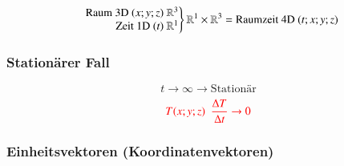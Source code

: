 $$\left.\begin{array}{r@{}}
    \text{Raum 3D ${(x;y;z)}$ }\rreal^3\\
    \text{Zeit 1D ${(t)}$ }\rreal^1
\end{array}\right\rbrace \rreal^{1}\times \rreal^3 = \text{Raumzeit 4D} \text{ } (t;x;y;z)$$

\subsubsection{Stationärer Fall}
$${t \rightarrow \infty \rightarrow \text{Stationär}}$$
$${{\color{red}T(x;y;z) \enspace\frac{\Delta{T}}{\Delta{t}} \rightarrow 0 }}$$


\subsubsection{Einheitsvektoren (Koordinatenvektoren)}

